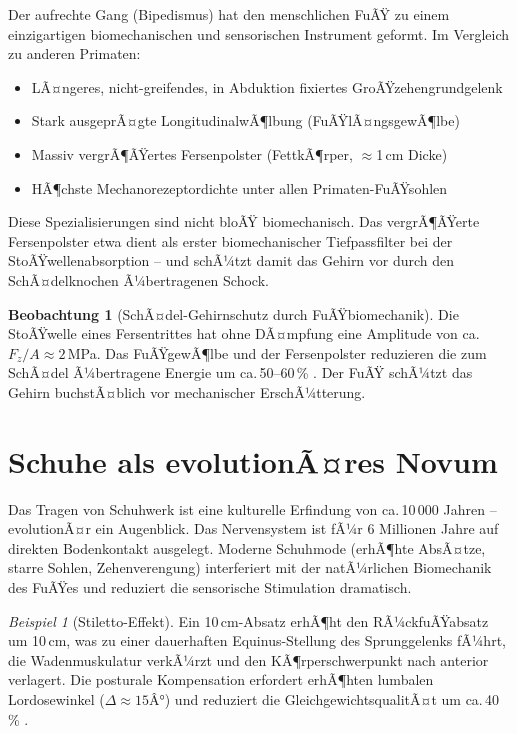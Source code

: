 ﻿\documentclass[12pt,a4paper]{report}
\theoremstyle{plain}
\theoremstyle{definition}
\newtheorem{beobachtung}[theorem]{Beobachtung}
\theoremstyle{remark}
\newtheorem{beispiel}[theorem]{Beispiel}
\begin{document}
Der aufrechte Gang (Bipedismus) hat den menschlichen FuÃŸ zu einem
einzigartigen biomechanischen und sensorischen Instrument geformt. Im
Vergleich zu anderen Primaten:

\begin{itemize}
\item LÃ¤ngeres, nicht-greifendes, in Abduktion fixiertes GroÃŸzehengrundgelenk
\item Stark ausgeprÃ¤gte LongitudinalwÃ¶lbung (FuÃŸlÃ¤ngsgewÃ¶lbe)
\item Massiv vergrÃ¶ÃŸertes Fersenpolster (FettkÃ¶rper, $\approx$1\,cm Dicke)
\item HÃ¶chste Mechanorezeptordichte unter allen Primaten-FuÃŸsohlen
\end{itemize}

Diese Spezialisierungen sind nicht bloÃŸ biomechanisch. Das vergrÃ¶ÃŸerte
Fersenpolster etwa dient als erster biomechanischer Tiefpassfilter
bei der StoÃŸwellenabsorption -- und schÃ¼tzt damit das Gehirn vor
durch den SchÃ¤delknochen Ã¼bertragenen Schock.

\begin{beobachtung}[SchÃ¤del-Gehirnschutz durch FuÃŸbiomechanik]
Die StoÃŸwelle eines Fersentrittes hat ohne DÃ¤mpfung eine Amplitude
von ca.\,$F_z/A \approx 2$\,MPa. Das FuÃŸgewÃ¶lbe und der Fersenpolster
reduzieren die zum SchÃ¤del Ã¼bertragene Energie um ca.\,50--60\,\%
\cite{whittle1997}. Der FuÃŸ schÃ¼tzt das Gehirn buchstÃ¤blich vor
mechanischer ErschÃ¼tterung.
\end{beobachtung}

\section{Schuhe als evolutionÃ¤res Novum}

Das Tragen von Schuhwerk ist eine kulturelle Erfindung von ca.\,10\,000
Jahren -- evolutionÃ¤r ein Augenblick. Das Nervensystem ist fÃ¼r 6 Millionen
Jahre auf direkten Bodenkontakt ausgelegt. Moderne Schuhmode
(erhÃ¶hte AbsÃ¤tze, starre Sohlen, Zehenverengung) interferiert mit
der natÃ¼rlichen Biomechanik des FuÃŸes und reduziert die sensorische
Stimulation dramatisch.

\begin{beispiel}[Stiletto-Effekt]
Ein 10\,cm-Absatz erhÃ¶ht den RÃ¼ckfuÃŸabsatz um 10\,cm, was zu einer
dauerhaften Equinus-Stellung des Sprunggelenks fÃ¼hrt, die
Wadenmuskulatur verkÃ¼rzt und den KÃ¶rperschwerpunkt nach anterior verlagert.
Die posturale Kompensation erfordert erhÃ¶hten lumbalen Lordosewinkel
($\Delta \approx 15Â°$) und reduziert die GleichgewichtsqualitÃ¤t um
ca.\,40\,\% \cite{snow1992}.
\end{beispiel}
\end{document}
